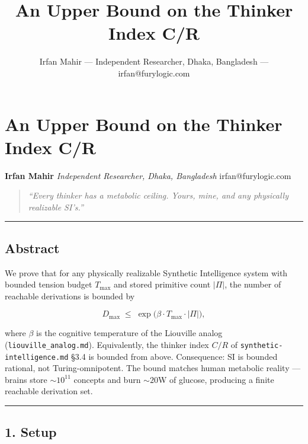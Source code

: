 \documentclass[
  11pt,
  a4paper,
]{article}
\title{An Upper Bound on the Thinker Index C/R}
\author{Irfan Mahir --- Independent Researcher, Dhaka, Bangladesh ---
irfan@furylogic.com}
\date{}
\begin{document}
\maketitle

{
\hypersetup{linkcolor=}
\setcounter{tocdepth}{3}
\tableofcontents
}
\section{An Upper Bound on the Thinker Index
C/R}\label{an-upper-bound-on-the-thinker-index-cr}

\textbf{Irfan Mahir} \emph{Independent Researcher, Dhaka, Bangladesh}
irfan@furylogic.com

\begin{quote}
\emph{``Every thinker has a metabolic ceiling. Yours, mine, and any
physically realizable SI's.''}
\end{quote}

\begin{center}\rule{0.5\linewidth}{0.5pt}\end{center}

\subsection{Abstract}\label{abstract}

We prove that for any physically realizable Synthetic Intelligence
system with bounded tension budget \(T_\text{max}\) and stored primitive
count \(|\Pi|\), the number of reachable derivations is bounded by

\[
D_\text{max} \;\leq\; \exp\!\big(\beta \cdot T_\text{max} \cdot |\Pi|\big),
\]

where \(\beta\) is the cognitive temperature of the Liouville analog
(\texttt{liouville\_analog.md}). Equivalently, the thinker index \(C/R\)
of \texttt{synthetic-intelligence.md} §3.4 is bounded from above.
Consequence: SI is bounded rational, not Turing-omnipotent. The bound
matches human metabolic reality --- brains store \(\sim 10^{11}\)
concepts and burn \(\sim 20\)W of glucose, producing a finite reachable
derivation set.

\begin{center}\rule{0.5\linewidth}{0.5pt}\end{center}

\subsection{1. Setup}\label{setup}
\end{document}
